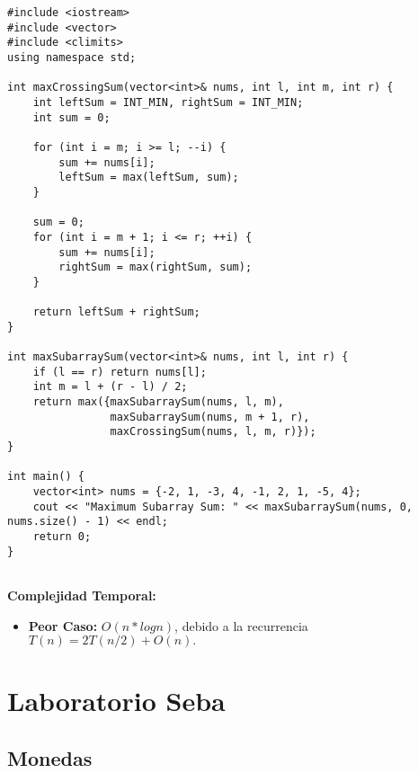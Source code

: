         \begin{lstlisting}[style=cpp]
#include <iostream>
#include <vector>
#include <climits>
using namespace std;

int maxCrossingSum(vector<int>& nums, int l, int m, int r) {
    int leftSum = INT_MIN, rightSum = INT_MIN;
    int sum = 0;

    for (int i = m; i >= l; --i) {
        sum += nums[i];
        leftSum = max(leftSum, sum);
    }

    sum = 0;
    for (int i = m + 1; i <= r; ++i) {
        sum += nums[i];
        rightSum = max(rightSum, sum);
    }

    return leftSum + rightSum;
}

int maxSubarraySum(vector<int>& nums, int l, int r) {
    if (l == r) return nums[l];
    int m = l + (r - l) / 2;
    return max({maxSubarraySum(nums, l, m),
                maxSubarraySum(nums, m + 1, r),
                maxCrossingSum(nums, l, m, r)});
}

int main() {
    vector<int> nums = {-2, 1, -3, 4, -1, 2, 1, -5, 4};
    cout << "Maximum Subarray Sum: " << maxSubarraySum(nums, 0, nums.size() - 1) << endl;
    return 0;
}


    \end{lstlisting}
    \textbf{Complejidad Temporal: }
    \begin{itemize}
        \item \textbf{Peor Caso: }$O(n *logn)$, debido a la recurrencia $T(n) = 2T(n/2) + O(n).$

    \end{itemize}

\newpage
    \section{Laboratorio Seba}
    \subsection{Monedas}


